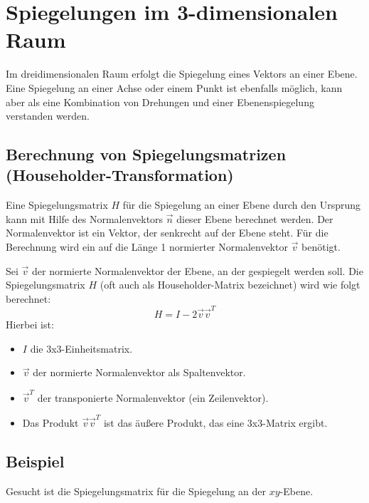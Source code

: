\section{Spiegelungen im 3-dimensionalen Raum}
Im dreidimensionalen Raum erfolgt die Spiegelung eines Vektors an einer Ebene. Eine Spiegelung an einer Achse oder einem Punkt ist ebenfalls möglich, kann aber als eine Kombination von Drehungen und einer Ebenenspiegelung verstanden werden.

\subsection{Berechnung von Spiegelungsmatrizen (Householder-Transformation)}
Eine Spiegelungsmatrix $H$ für die Spiegelung an einer Ebene durch den Ursprung kann mit Hilfe des Normalenvektors $\vec{n}$ dieser Ebene berechnet werden. Der Normalenvektor ist ein Vektor, der senkrecht auf der Ebene steht. Für die Berechnung wird ein auf die Länge 1 normierter Normalenvektor $\vec{v}$ benötigt.

Sei $\vec{v}$ der normierte Normalenvektor der Ebene, an der gespiegelt werden soll. Die Spiegelungsmatrix $H$ (oft auch als Householder-Matrix bezeichnet) wird wie folgt berechnet:
\[ H = I - 2 \vec{v} \vec{v}^T \]
Hierbei ist:
\begin{itemize}
    \item $I$ die 3x3-Einheitsmatrix.
    \item $\vec{v}$ der normierte Normalenvektor als Spaltenvektor.
    \item $\vec{v}^T$ der transponierte Normalenvektor (ein Zeilenvektor).
    \item Das Produkt $\vec{v} \vec{v}^T$ ist das äußere Produkt, das eine 3x3-Matrix ergibt.
\end{itemize}

\subsection{Beispiel}
Gesucht ist die Spiegelungsmatrix für die Spiegelung an der $xy$-Ebene.

